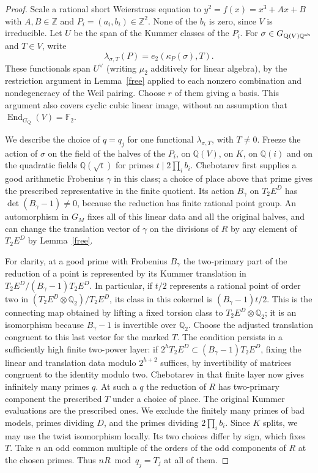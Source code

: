 \documentclass[11pt]{article}
\newcommand{\Q}{\mathbb Q}\newcommand{\Z}{\mathbb Z}\newcommand{\F}{\mathbb F}
\begin{document}
\begin{proof}
Scale a rational short Weierstrass equation to
$y^2=f(x)=x^3+Ax+B$ with $A,B\in\Z$ and
$P_i=(a_i,b_i)\in\Z^2$. None of the $b_i$ is zero, since $V$ is
irreducible. Let $U$ be the span of the Kummer classes of the $P_i$.
For $\sigma\in G_{\mathrm Q(V)\Q^{\rm ab}}$ and $T\in V$, write
\[
        \lambda_{\sigma,T}(P)=e_2(\kappa_P(\sigma),T).
\]
These functionals span $U^\vee$ (writing $\mu_2$ additively for
linear algebra), by the restriction argument in Lemma~\ref{free}
applied to each nonzero combination and nondegeneracy of the Weil
pairing. Choose $r$ of them giving a basis. This argument also
covers cyclic cubic linear image, without an assumption that
$\operatorname{End}_{G_{\mathrm Q}}(V)=\F_2$.

We describe the choice of $q=q_j$ for one functional
$\lambda_{\sigma,T}$, with $T\ne0$. Freeze the action of $\sigma$
on the field of the halves of the $P_i$, on $\Q(V)$, on $K$, on
$\Q(i)$ and on the quadratic fields $\Q(\sqrt t)$ for primes
$t\mid 2\prod_i b_i$. Chebotarev first supplies a good arithmetic
Frobenius $\gamma$ in this class; a choice of place above that prime
gives the prescribed representative in the finite quotient. Its
action $B_\gamma$ on $T_2E^D$ has $\det(B_\gamma-1)\ne0$, because
the reduction has finite rational point group. An automorphism in
$G_M$ fixes all of this linear data and all the original halves, and
can change the translation vector of $\gamma$ on the divisions of
$R$ by any element of $T_2E^D$ by Lemma~\ref{free}.

For clarity, at a good prime with Frobenius $B_\gamma$ the two-primary
part of the reduction of a point is represented by its Kummer
translation in $T_2E^D/(B_\gamma-1)T_2E^D$. In particular, if $t/2$
represents a rational point of order two in
$(T_2E^D\otimes\Q_2)/T_2E^D$, its class in this cokernel is
$(B_\gamma-1)t/2$. This is the connecting map obtained by lifting a
fixed torsion class to $T_2E^D\otimes\Q_2$; it is an isomorphism
because $B_\gamma-1$ is invertible over $\Q_2$.
Choose the adjusted translation congruent to this last vector for the
marked $T$. The condition persists in a sufficiently high finite
two-power layer: if $2^hT_2E^D\subset(B_\gamma-1)T_2E^D$, fixing
the linear and translation data modulo $2^{h+2}$ suffices, by
invertibility of matrices congruent to the identity modulo two.
Chebotarev in that finite layer now gives infinitely many primes $q$.
At such a $q$ the reduction of $R$ has two-primary component the
prescribed $T$ under a choice of place. The original Kummer
evaluations are the prescribed ones. We exclude the finitely many
primes of bad models, primes dividing $D$, and the primes dividing
$2\prod_i b_i$. Since $K$ splits, we may use the twist isomorphism
locally. Its two choices differ by sign, which fixes $T$.
Take $n$ an odd common multiple of the orders of the odd components
of $R$ at the chosen primes. Thus $nR\bmod q_j=T_j$ at all of them.


\end{proof}
\end{document}
